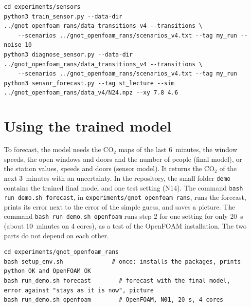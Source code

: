 \begin{lstlisting}[breaklines=true,postbreak=\space]
cd experiments/sensors
python3 train_sensor.py --data-dir ../gnot_openfoam_rans/data_transitions_v4 --transitions \
    --scenarios ../gnot_openfoam_rans/scenarios_v4.txt --tag my_run --noise 10
python3 diagnose_sensor.py --data-dir ../gnot_openfoam_rans/data_transitions_v4 --transitions \
    --scenarios ../gnot_openfoam_rans/scenarios_v4.txt --tag my_run
python3 sensor_forecast.py --tag st_lecture --sim ../gnot_openfoam_rans/data_v4/N24.npz --xy 7.8 4.6
\end{lstlisting}


\section{Using the trained model}
To forecast, the model needs the CO$_2$ maps of the last 6~minutes, the window speeds, the open windows and doors and the number
of people (final model), or the station values, speeds and doors (sensor model). It returns the CO$_2$ of the next 3~minutes with an
uncertainty. In the repository, the small folder \texttt{demo} contains the trained final model and one test setting (N14). The command
\texttt{bash run\_demo.sh forecast}, in \texttt{experiments/\allowbreak gnot\_\allowbreak openfoam\_\allowbreak rans},
runs the forecast, prints its error next to the error of the simple guess, and saves a picture. The command
\texttt{bash run\_demo.sh openfoam} runs step 2 for one setting for only 20~s (about 10~minutes on 4 cores), as a test of the OpenFOAM
installation. The two parts do not depend on each other.

\begin{lstlisting}[breaklines=true,postbreak=\space]
cd experiments/gnot_openfoam_rans
bash setup_env.sh              # once: installs the packages, prints python OK and OpenFOAM OK
bash run_demo.sh forecast        # forecast with the final model, error against "stays as it is now", picture
bash run_demo.sh openfoam        # OpenFOAM, N01, 20 s, 4 cores
\end{lstlisting}

